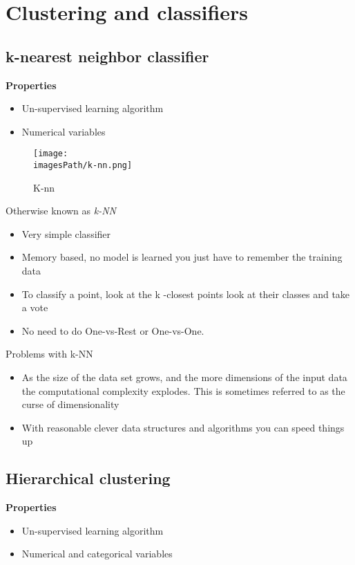 \documentclass{article}
\newcommand{\imagesPath}{images}
\begin{document}
\section{Clustering and classifiers}
\subsection{k-nearest neighbor classifier}
\textbf{Properties}
\begin{itemize}
    \item Un-supervised learning algorithm
    \item Numerical variables 
\end{itemize}
\begin{figure}[!h]
    \centering
    \texttt{[image: \\imagesPath/k-nn.png]}
    \caption{K-nn}
\end{figure}


Otherwise known as \textit{k-NN}
\begin{itemize}
    \item Very simple classifier
    \item Memory based, no model is learned you just have to remember the
training data
    \item To classify a point, look at the k -closest points look at their classes
and take a vote
    \item No need to do One-vs-Rest or One-vs-One.
\end{itemize}

Problems with k-NN
\begin{itemize}
    \item As the size of the data set grows, and the more dimensions of the
    input data the computational complexity explodes. This is sometimes
    referred to as the curse of dimensionality
    \item With reasonable clever data structures and algorithms you can speed
things up
\end{itemize}


\subsection{Hierarchical clustering}
\textbf{Properties}
\begin{itemize}
    \item Un-supervised learning algorithm
    \item Numerical and categorical variables 
\end{itemize}
\end{document}
